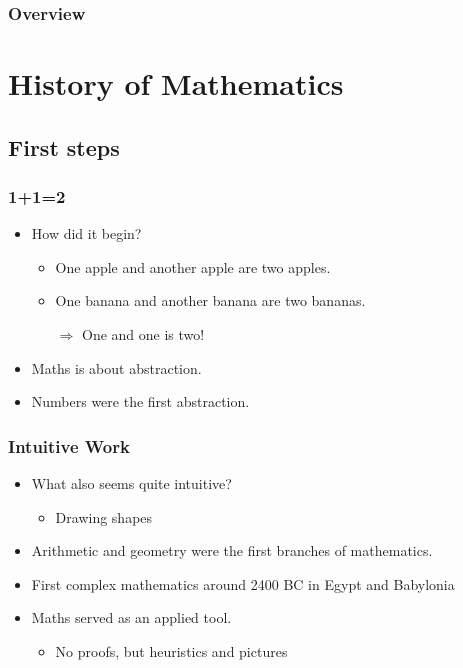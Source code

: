 \documentclass{beamer}
\begin{document}

\begin{frame}
    \frametitle{Overview} 
        \tableofcontents
\end{frame}

\section{History of Mathematics}
\subsection{First steps}
\begin{frame}
    \frametitle{1+1=2}
    \begin{itemize}[<+->]
	\item How did it begin?
	\begin{itemize}
		\item One apple and another apple are two apples.
		\item One banana and another banana are two bananas.
		\item[$\Rightarrow$] One and one is two!
	\end{itemize}
	\item Maths is about abstraction.
	\item Numbers were the first abstraction.
    \end{itemize}
\end{frame}
\begin{frame}
    \frametitle{Intuitive Work}
    \begin{itemize}[<+->]
	\item What also seems quite intuitive?
	\begin{itemize}
		\item Drawing shapes
	\end{itemize}
	\item Arithmetic and geometry were the first branches of mathematics.
	\item First complex mathematics around 2400 BC in Egypt and Babylonia
	\item Maths served as an applied tool.
	\begin{itemize}
		\item No proofs, but heuristics and pictures
	\end{itemize}
    \end{itemize}
\end{frame}
\end{document}
